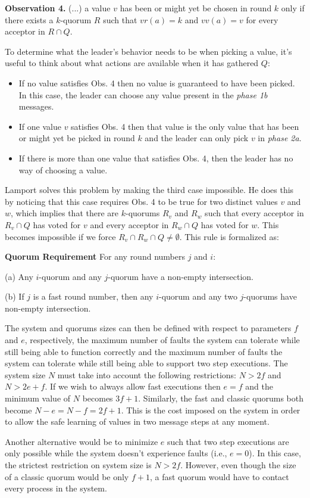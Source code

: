 \begin{displayquote}
	\textbf{Observation 4.} (...) a value $v$ has been or might yet be chosen in round $k$ only if there exists a $k$-quorum $R$ such that $vr(a)=k$ and $vv(a)=v$ for every acceptor in $R \cap Q$.
\end{displayquote}

To determine what the leader's behavior needs to be when picking a value, it's useful to think about what actions are available when it has gathered $Q$:
\begin{itemize}
	\item If no value satisfies Obs. 4 then no value is guaranteed to have been picked. In this case, the leader can choose any value present in the \textit{phase 1b} messages.
	\item If one value $v$ satisfies Obs. 4 then that value is the only value that has been or might yet be picked in round $k$ and the leader can only pick $v$ in \textit{phase 2a}.
	\item If there is more than one value that satisfies Obs. 4, then the leader has no way of choosing a value.
\end{itemize} 

Lamport solves this problem by making the third case impossible. He does this by noticing that this case requires Obs. 4 to be true for two distinct values $v$ and $w$, which implies that there are $k$-quorums $R_v$ and $R_w$ such that every acceptor in $R_v \cap Q$ has voted for $v$ and every acceptor in $R_w \cap Q$ has voted for $w$. This becomes impossible if we force $R_v \cap R_w \cap Q \neq \emptyset$. This rule is formalized as:

\begin{displayquote}
	\textbf{Quorum Requirement} For any round numbers $j$ and $i$:\par
	(a) Any $i$-quorum and any $j$-quorum have a non-empty intersection.\par
	(b) If $j$ is a fast round number, then any $i$-quorum and any two $j$-quorums have non-empty intersection. 	
\end{displayquote}

The system and quorums sizes can then be defined with respect to parameters $f$ and $e$, respectively, the maximum number of faults the system can tolerate while still being able to function correctly and the maximum number of faults the system can tolerate while still being able to support two step executions. The system size $N$ must take into account the following restrictions: $N > 2f$ and $N > 2e+f$. If we wish to always allow fast executions then $e=f$ and the minimum value of $N$ becomes $3f+1$. Similarly, the fast and classic quorums both become $N-e=N-f= 2f+1$. This is the cost imposed on the system in order to allow the safe learning of values in two message steps at any moment. {\color{red}Another alternative would be to minimize $e$ such that two step executions are only possible while the system doesn't experience faults (i.e., $e=0$). In this case, the strictest restriction on system size is $N>2f$. However, even though the size of a classic quorum would be only $f+1$, a fast quorum would have to contact every process in the system.\par}